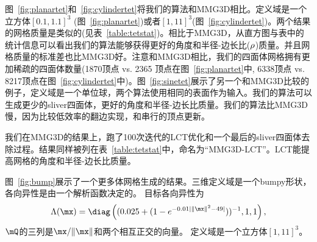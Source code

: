 图~\ref{fig:planartet}和~\ref{fig:cylindertet}将我们的算法和MMG3D相比。定义域是一个立方体$[0.1,1.1]^3$ (图~\ref{fig:planartet})或者$[1,11]^3$(图~\ref{fig:cylindertet})。两个结果的网格质量是类似的(见表~\ref{table:tetstat})。相比于MMG3D，从直方图与表中的统计信息可以看出我们的算法能够获得更好的角度和半径-边长比($\rho$)质量。并且网格质量的标准差也比MMG3D好。注意和MMG3D相比，我们的四面体网格拥有更加稀疏的四面体数量(1870顶点 vs. 2365 顶点在图~\ref{fig:planartet}中, 6338顶点 vs. 8217顶点在图~\ref{fig:cylindertet}中)。图~\ref{fig:sinetet}展示了另一个和MMG3D比较的例子，定义域是一个单位球，两个算法使用相同的表面作为输入。我们的算法可以生成更少的sliver四面体，更好的角度和半径-边长比质量。我们的算法比MMG3D慢，因为比较低效率的翻边实现，和串行的顶点更新。

我们在MMG3D的结果上，跑了100次迭代的LCT优化和一个最后的sliver四面体去除过程。结果同样被列在表~\ref{table:tetstat}中，命名为“MMG3D-LCT”。LCT能提高网格的角度和半径-边长比质量。

图~\ref{fig:bump}展示了一个更多体网格生成的结果。三维定义域是一个bumpy形状，各向异性是由一个解析函数决定的。 目标各向异性为
\begin{equation}
\Lambda(\mx) = \diag\left((0.025+(1-e^{-0.01|\|\mx\|^2-49|}))^{-1},1,1\right),
\end{equation}
$\mQ$的三列是$\mx/\|\mx\|$和两个相互正交的向量。 定义域是一个立方体$[1,11]^3$。

